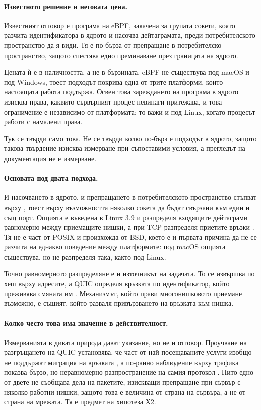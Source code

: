\paragraph{Известното решение и неговата цена.} Известният отговор е програма на eBPF, закачена
за групата сокети, която разчита идентификатора в ядрото и насочва дейтаграмата, преди
потребителското пространство да я види. Тя е по-бърза от препращане в потребителско
пространство, защото спестява едно преминаване през границата на ядрото.

Цената ѝ е в наличността, а не в бързината. eBPF не съществува под macOS и под Windows, тоест
подходът покрива една от трите платформи, които настоящата работа поддържа. Освен това
зареждането на програма в ядрото изисква права, каквито сървърният процес невинаги притежава,
и това ограничение е независимо от платформата: то важи и под Linux, когато процесът работи с
намалени права.

Тук се твърди само това. Не се твърди колко по-бърз е подходът в ядрото, защото такова
твърдение изисква измерване при съпоставими условия, а прегледът на документация не е
измерване.

\paragraph{Основата под двата подхода.} И насочването в ядрото, и препращането в
потребителското пространство стъпват върху , тоест върху възможността
няколко сокета да бъдат свързани към един и същ порт. Опцията е въведена в Linux 3.9 и
разпределя входящите дейтаграми равномерно между приемащите нишки, а при TCP разпределя
приетите връзки \cite{kerrisk2013reuseport}. Тя не е част от POSIX и произхожда от BSD, което
е и първата причина да не се разчита на еднакво поведение между платформите: под macOS
опцията съществува, но не разпределя така, както под Linux.

Точно равномерното разпределяне е и източникът на задачата. То се извършва по хеш върху
адресите, а QUIC определя връзката по идентификатор, който преживява смяната им
\cite{rfc9000}. Механизмът, който прави многонишковото приемане възможно, е същият, който
разваля привързването на връзката към нишка.

\paragraph{Колко често това има значение в действителност.} Измерванията в дивата природа
дават указание, но не и отговор. Проучване на разгръщането на QUIC установява, че част от
най-посещаваните услуги изобщо не поддържат миграция на връзката \cite{buchet2025migration},
а по-ранно наблюдение върху трафика показва бързо, но неравномерно разпространение на самия
протокол \cite{ruth2018quic}. Нито едно от двете не съобщава дела на пакетите, изискващи
препращане при сървър с няколко работни нишки, защото това е величина от страна на сървъра, а
не от страна на мрежата. Тя е предмет на хипотеза Х2.

